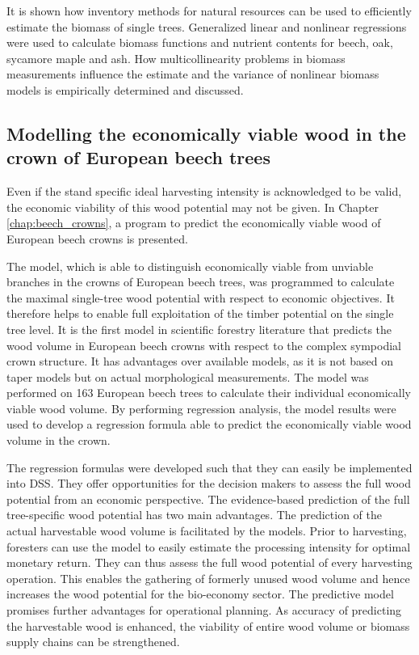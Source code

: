 It is shown how inventory methods for natural resources can be used to efficiently estimate the biomass of single trees. Generalized linear and nonlinear regressions were used to calculate biomass functions and nutrient contents for beech, oak, sycamore maple and ash. How multicollinearity problems in biomass measurements influence the estimate and the variance of nonlinear biomass models is empirically determined and discussed.

\subsection{Modelling the economically viable wood in the crown of European beech trees}
\label{subsec:intro:struct:beech_crowns}
Even if the stand specific ideal harvesting intensity is acknowledged to be valid, the economic viability of this wood potential may not be given. In Chapter \ref{chap:beech_crowns}, a program to predict the economically viable wood of European beech crowns is presented.

The model, which is able to distinguish economically viable from unviable branches in the crowns of European beech trees, was programmed to calculate the maximal single-tree wood potential with respect to economic objectives. It therefore helps to enable full exploitation of the timber potential on the single tree level. It is the first model in scientific forestry literature that predicts the wood volume in European beech crowns with respect to the complex sympodial crown structure. It has advantages over available models, as it is not based on taper models but on actual morphological measurements. The model was performed on 163 European beech trees to calculate their individual economically viable wood volume. By performing regression analysis, the model results were used to develop a regression formula able to predict the economically viable wood volume in the crown.

The regression formulas were developed such that they can easily be implemented into DSS. They offer opportunities for the decision makers to assess the full wood potential from an economic perspective. The evidence-based prediction of the full tree-specific wood potential has two main advantages. The prediction of the actual harvestable wood volume is facilitated by the models. Prior to harvesting, foresters can use the model to easily estimate the processing intensity for optimal monetary return. They can thus assess the full wood potential of every harvesting operation. This enables the gathering of formerly unused wood volume and hence increases the wood potential for the bio-economy sector. The predictive model promises further advantages for operational planning. As accuracy of predicting the harvestable wood is enhanced, the viability of entire wood volume or biomass supply chains can be strengthened.

